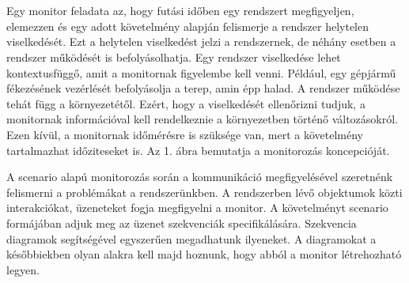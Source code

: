 \chapter{\bevezetes}

Egy monitor feladata az, hogy futási időben egy rendszert megfigyeljen, elemezzen és egy adott követelmény alapján felismerje a rendszer helytelen viselkedését. Ezt a helytelen viselkedést jelzi a rendszernek, de néhány esetben a rendszer működését is befolyásolhatja. Egy rendszer viselkedése lehet kontextusfüggő, amit a monitornak figyelembe kell venni. Például, egy gépjármű fékezésének vezérlését befolyásolja a terep, amin épp halad. A rendszer működése tehát függ a környezetétől. Ezért, hogy a viselkedését ellenőrizni tudjuk, a monitornak információval kell rendelkeznie a környezetben történő változásokról. Ezen kívül, a monitornak időmérésre is szüksége van, mert a követelmény tartalmazhat időziteseket is. Az 1. ábra bemutatja a monitorozás koncepcióját.


A scenario alapú monitorozás során a kommunikáció megfigyelésével szeretnénk felismerni a problémákat a rendszerünkben. A rendszerben lévő objektumok közti interakciókat, üzeneteket fogja megfigyelni a monitor. A követelményt scenario formájában adjuk meg az üzenet szekvenciák specifikálására. Szekvencia diagramok segítségével egyszerűen megadhatunk ilyeneket. A diagramokat a későbbiekben olyan alakra kell majd hoznunk, hogy abból a monitor létrehozható legyen.

